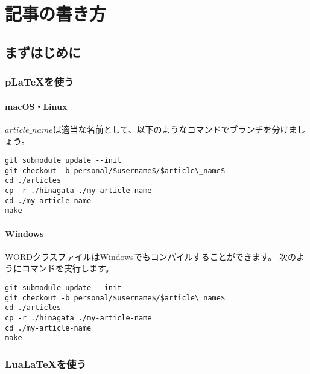 \documentclass[../../main]{subfiles}
\begin{document}
\renewcommand{\thelstlisting}{\arabic{lstlisting}}

\subtitle{ヘッダの見出し}


\author{編集部 太郎}

\chapter{記事の書き方}

\section{まずはじめに}

\subsection{p\LaTeX を使う}

\subsubsection{macOS・Linux}

$article\_name$は適当な名前として、以下のようなコマンドでブランチを分けましょう。

\begin{lstlisting}[mathescape]
git submodule update --init
git checkout -b personal/$username$/$article\_name$
cd ./articles
cp -r ./hinagata ./my-article-name
cd ./my-article-name
make
\end{lstlisting}

\subsubsection{Windows}

WORDクラスファイルはWindowsでもコンパイルすることができます。
次のようにコマンドを実行します。

\begin{lstlisting}[mathescape]
git submodule update --init
git checkout -b personal/$username$/$article\_name$
cd ./articles
cp -r ./hinagata ./my-article-name
cd ./my-article-name
make
\end{lstlisting}

\subsection{Lua\LaTeX を使う}
\end{document}
